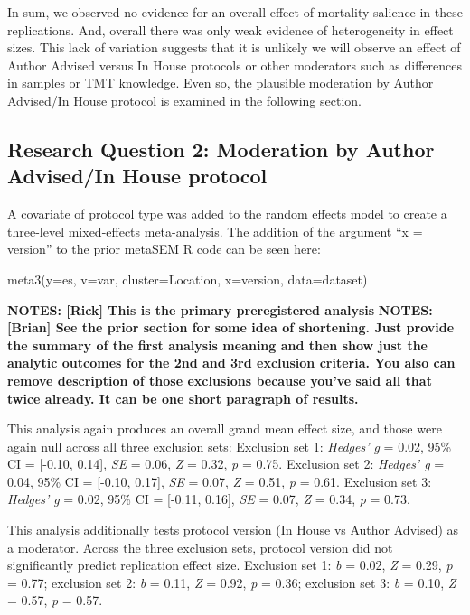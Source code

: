 \documentclass[man]{apa6}
\begin{document}
In sum, we observed no evidence for an overall effect of mortality salience in these replications. And, overall there was only weak evidence of heterogeneity in effect sizes. This lack of variation suggests that it is unlikely we will observe an effect of Author Advised versus In House protocols or other moderators such as differences in samples or TMT knowledge. Even so, the plausible moderation by Author Advised/In House protocol is examined in the following section.

\hypertarget{research-question-2-moderation-by-author-advisedin-house-protocol}{%
\subsection{Research Question 2: Moderation by Author Advised/In House protocol}\label{research-question-2-moderation-by-author-advisedin-house-protocol}}

A covariate of protocol type was added to the random effects model to create a three-level mixed-effects meta-analysis. The addition of the argument \enquote{x = version} to the prior metaSEM R code can be seen here:

meta3(y=es, v=var, cluster=Location, x=version, data=dataset)

\textbf{NOTES: {[}Rick{]} This is the primary preregistered analysis}
\textbf{NOTES: {[}Brian{]} See the prior section for some idea of shortening. Just provide the summary of the first analysis meaning and then show just the analytic outcomes for the 2nd and 3rd exclusion criteria. You also can remove description of those exclusions because you've said all that twice already. It can be one short paragraph of results.}

This analysis again produces an overall grand mean effect size, and those were again null across all three exclusion sets: Exclusion set 1: \emph{Hedges' g} = 0.02, 95\% CI = {[}-0.10, 0.14{]}, \emph{SE} = 0.06, \emph{Z} = 0.32, \emph{p} = 0.75. Exclusion set 2: \emph{Hedges' g} = 0.04, 95\% CI = {[}-0.10, 0.17{]}, \emph{SE} = 0.07, \emph{Z} = 0.51, \emph{p} = 0.61. Exclusion set 3: \emph{Hedges' g} = 0.02, 95\% CI = {[}-0.11, 0.16{]}, \emph{SE} = 0.07, \emph{Z} = 0.34, \emph{p} = 0.73.

This analysis additionally tests protocol version (In House vs Author Advised) as a moderator. Across the three exclusion sets, protocol version did not significantly predict replication effect size. Exclusion set 1: \emph{b} = 0.02, \emph{Z} = 0.29, \emph{p} = 0.77; exclusion set 2: \emph{b} = 0.11, \emph{Z} = 0.92, \emph{p} = 0.36; exclusion set 3: \emph{b} = 0.10, \emph{Z} = 0.57, \emph{p} = 0.57.
\end{document}
